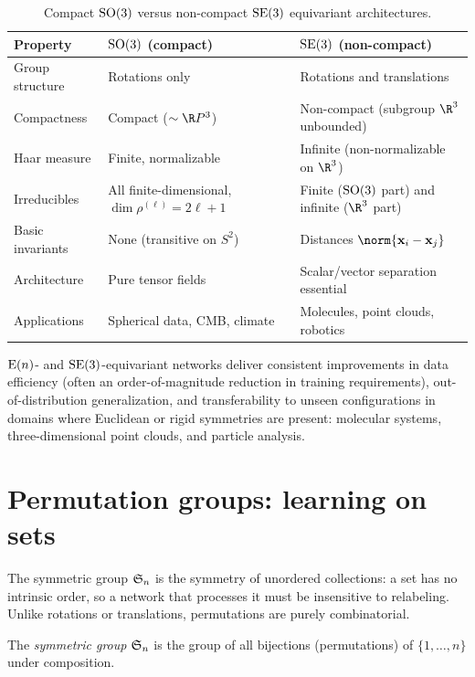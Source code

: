 \begin{table}[h]
\centering
\caption{Compact $\operatorname{SO}(3)$ versus non-compact $\operatorname{SE}(3)$ equivariant
architectures.}
\label{tab:groups:so3-vs-se3}
\begin{tabular}{@{}lp{4.6cm}p{4.6cm}@{}}
\toprule
\textbf{Property} & \textbf{$\operatorname{SO}(3)$ (compact)} & \textbf{$\operatorname{SE}(3)$ (non-compact)} \\
\midrule
Group structure & Rotations only & Rotations and translations \\
\addlinespace
Compactness & Compact ($\sim \R P^3$) & Non-compact (subgroup $\R^3$ unbounded) \\
\addlinespace
Haar measure & Finite, normalizable & Infinite (non-normalizable on $\R^3$) \\
\addlinespace
Irreducibles & All finite-dimensional, $\dim \rho^{(\ell)} = 2\ell+1$ & Finite ($\operatorname{SO}(3)$ part) and infinite ($\R^3$ part) \\
\addlinespace
Basic invariants & None (transitive on $S^2$) & Distances $\norm{\mathbf{x}_i - \mathbf{x}_j}$ \\
\addlinespace
Architecture & Pure tensor fields & Scalar/vector separation essential \\
\addlinespace
Applications & Spherical data, CMB, climate & Molecules, point clouds, robotics \\
\bottomrule
\end{tabular}
\end{table}

$\operatorname{E}(n)$- and $\operatorname{SE}(3)$-equivariant networks deliver consistent improvements in
data efficiency (often an order-of-magnitude reduction in training
requirements), out-of-distribution generalization, and transferability to unseen
configurations in domains where Euclidean or rigid symmetries are present:
molecular systems, three-dimensional point clouds, and particle analysis.

\section{Permutation groups: learning on sets}
\label{sec:groups:permutations}

The symmetric group $\mathfrak{S}_n$ is the symmetry of unordered collections: a set has
no intrinsic order, so a network that processes it must be insensitive to
relabeling. Unlike rotations or translations, permutations are purely
combinatorial.

\begin{definition}
\label{def:groups:symmetric-group}
The \emph{symmetric group} $\mathfrak{S}_n$ is the group of all bijections (permutations)
of $\{1, \dots, n\}$ under composition.
\end{definition}

